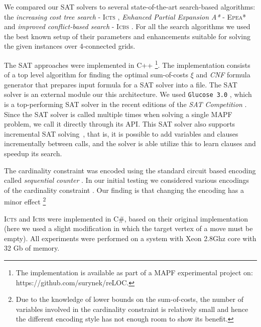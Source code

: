 \documentclass[jair,oneside,11pt]{article}
\begin{document}

We compared our SAT solvers to several state-of-the-art search-based algorithms: the \textit{increasing cost tree search} - \textsc{Icts}
\cite{DBLP:journals/ai/SharonSGF13}, {\em Enhanced Partial Expansion A*} - \textsc{Epea}* \cite{EPEJAIR} and \textit{improved conflict-based search} - \textsc{Icbs} \cite{DBLP:conf/ijcai/BoyarskiFSSTBS15}.  For all the search algorithms we used the best known setup of their parameters and enhancements suitable for solving the given instances over 4-connected grids.

The SAT approaches were implemented in C++ \footnote{The implementation is available as part of a MAPF experimental project on: https://github.com/surynek/reLOC.}. The implementation consists of a top level algorithm for finding the optimal sum-of-costs $\xi$ and {\em CNF} formula generator \cite{Biere:2009:HSV:1550723} that prepares input formula for a SAT solver into a file. The SAT solver is an external module our this architecture. We used \texttt{Glucose 3.0} \cite{DBLP:conf/ijcai/AudemardS09,DBLP:conf/sat/AudemardLS13}, which is a top-performing SAT solver in the recent editions of the \textit{SAT Competition} \cite{DBLP:journals/aim/JarvisaloBRS12,DBLP:conf/ictai/Surynek14,DBLP:conf/aaai/BalyoHJ17}.
Since the SAT solver is called multiple times when solving a single MAPF problem, we call it directly through its API. This SAT solver also supports incremental SAT solving~\cite{fazekas2019incremental,DBLP:conf/sat/AudemardLS13}, that is, it is possible to add variables and clauses incrementally between calls, and the solver is able utilize this to learn clauses and speedup its search.

The cardinality constraint was encoded using the standard circuit based encoding called \textit{sequential counter} \cite{DBLP:conf/cp/Sinz05}. In our initial testing we considered various encodings of the cardinality constraint \cite{DBLP:conf/cp/BailleuxB03,DBLP:conf/cp/SilvaL07}. Our finding is that changing the encoding has a minor effect \footnote{Due to the knowledge of lower bounds on the sum-of-costs, the number of variables involved in the cardinality constraint is relatively small and hence the different encoding style has not enough room to show its benefit.}

\textsc{Icts} and \textsc{Icbs} were implemented in C\#, based on their original implementation (here we used a slight modification in which the target vertex of a move must be empty). All experiments were performed on a system with Xeon 2.8Ghz core with 32 Gb of memory.
\end{document}
